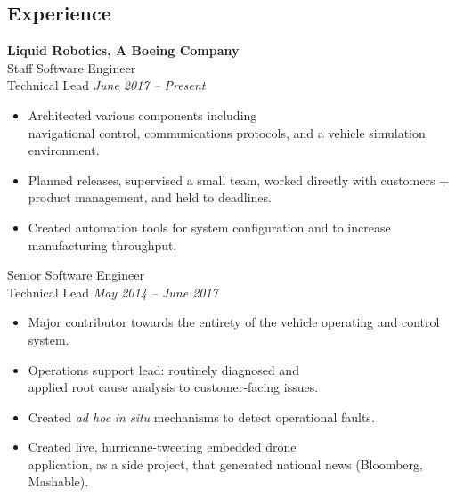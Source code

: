 \documentclass{article}
\begin{document}
{\begin{multicols}{2}
            \section*{Experience}
            \noindent
                \textbf{Liquid Robotics, A Boeing Company}\\
                Staff Software Engineer\\
                Technical Lead \hfill \textsl{June 2017 -- Present} \\
                \vspace{ -10px}
                \begin{itemize}[noitemsep,nolistsep]
                    \item Architected various components including \\navigational control, communications protocols, and a vehicle simulation environment.
                    \item Planned releases, supervised a small team, worked directly with customers + product management, and held to deadlines.
                    \item Created automation tools for system configuration and to increase manufacturing throughput.
                \end{itemize}
                \vspace{10px}
                Senior Software Engineer\\
                Technical Lead \hfill \textsl{May 2014 -- June 2017} \\
                \vspace{ -10px}
                \begin{itemize}[noitemsep,nolistsep]
                	\item Major contributor towards the entirety of the vehicle operating and control system.
                     \item Operations support lead: routinely diagnosed and \\applied root cause analysis to customer-facing issues.
                     \item Created \textit{ad hoc} \textit{in situ} mechanisms to detect operational faults. 
                     \item Created live, hurricane-tweeting embedded drone \\application, as a side project, that generated national news (Bloomberg, Mashable).

\end{itemize}
\end{multicols}}
\end{document}
